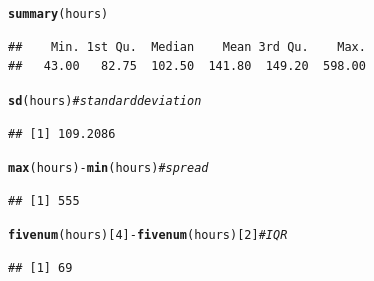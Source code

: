 \documentclass{article}\usepackage[]{graphicx}\usepackage[]{color}
\makeatletter
\newcommand{\hlnum}[1]{\textcolor[rgb]{0.686,0.059,0.569}{#1}}%
\newcommand{\hlcom}[1]{\textcolor[rgb]{0.678,0.584,0.686}{\textit{#1}}}%
\newcommand{\hlopt}[1]{\textcolor[rgb]{0,0,0}{#1}}%
\newcommand{\hlstd}[1]{\textcolor[rgb]{0.345,0.345,0.345}{#1}}%
\newcommand{\hlkwd}[1]{\textcolor[rgb]{0.737,0.353,0.396}{\textbf{#1}}}%
\newenvironment{kframe}{%
 \def\at@end@of@kframe{}%
 \ifinner\ifhmode%
  \def\at@end@of@kframe{\end{minipage}}%
  \begin{minipage}{\columnwidth}%
 \fi\fi%
 \def\FrameCommand##1{\hskip\@totalleftmargin \hskip-\fboxsep
 \colorbox{shadecolor}{##1}\hskip-\fboxsep
     \hskip-\linewidth \hskip-\@totalleftmargin \hskip\columnwidth}%
 \MakeFramed {\advance\hsize-\width
   \@totalleftmargin\z@ \linewidth\hsize
   \@setminipage}}%
 {\par\unskip\endMakeFramed%
 \at@end@of@kframe}
\newenvironment{knitrout}{}{} %
\makeatother
\begin{document}
\begin{knitrout}
\color{fgcolor}\begin{kframe}
\begin{alltt}
\hlkwd{summary}\hlstd{(hours)}
\end{alltt}
\begin{verbatim}
##    Min. 1st Qu.  Median    Mean 3rd Qu.    Max. 
##   43.00   82.75  102.50  141.80  149.20  598.00
\end{verbatim}
\begin{alltt}
\hlkwd{sd}\hlstd{(hours)} \hlcom{# standard deviation}
\end{alltt}
\begin{verbatim}
## [1] 109.2086
\end{verbatim}
\begin{alltt}
\hlkwd{max}\hlstd{(hours)} \hlopt{-} \hlkwd{min}\hlstd{(hours)} \hlcom{#spread}
\end{alltt}
\begin{verbatim}
## [1] 555
\end{verbatim}
\begin{alltt}
\hlkwd{fivenum}\hlstd{(hours)[}\hlnum{4}\hlstd{]} \hlopt{-} \hlkwd{fivenum}\hlstd{(hours)[}\hlnum{2}\hlstd{]} \hlcom{#IQR}
\end{alltt}
\begin{verbatim}
## [1] 69
\end{verbatim}
\end{kframe}
\end{knitrout}
\end{document}
